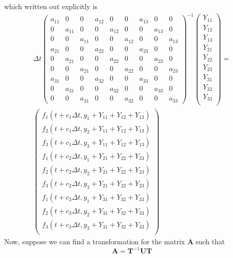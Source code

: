 \documentclass[10pt,a4paper]{article}
\newcommand{\bvec}[1]{\mathbf{#1}}
\begin{document}
which written out explicitly is
\begin{align*}
  \Delta t \begin{pmatrix}
    a_{11} & 0 & 0 &  a_{12} & 0 & 0 & a_{13} & 0 & 0 \\
    0 & a_{11} & 0 & 0 &  a_{12} & 0 & 0 & a_{13} & 0 \\
    0 & 0 & a_{11} & 0 & 0 &  a_{12} & 0 & 0 & a_{13} \\
    a_{21} & 0 & 0 &  a_{22} & 0 & 0 & a_{23} & 0 & 0 \\
    0 & a_{21} & 0 & 0 &  a_{22} & 0 & 0 & a_{23} & 0 \\
    0 & 0 & a_{21} & 0 & 0 &  a_{22} & 0 & 0 & a_{23} \\
    a_{31} & 0 & 0 &  a_{32} & 0 & 0 & a_{33} & 0 & 0 \\
    0 & a_{31} & 0 & 0 &  a_{32} & 0 & 0 & a_{33} & 0 \\
    0 & 0 & a_{31} & 0 & 0 &  a_{32} & 0 & 0 & a_{33}
     \end{pmatrix}^{-1}
     \begin{pmatrix}
       Y_{11} \\
       Y_{12} \\
       Y_{13} \\
       Y_{21} \\
       Y_{22} \\
       Y_{23} \\
       Y_{31} \\
       Y_{32} \\
       Y_{33} \\
     \end{pmatrix} = \\
  \begin{pmatrix}
      f_1(t+c_1\Delta t, y_1+Y_{11}+Y_{12}+Y_{13}) \\
      f_2(t+c_1\Delta t, y_2+Y_{11}+Y_{12}+Y_{13}) \\
      f_3(t+c_1\Delta t, y_3+Y_{11}+Y_{12}+Y_{13}) \\
      f_1(t+c_2\Delta t, y_1+Y_{21}+Y_{22}+Y_{23}) \\
      f_2(t+c_2\Delta t, y_2+Y_{21}+Y_{22}+Y_{23}) \\
      f_3(t+c_2\Delta t, y_3+Y_{21}+Y_{22}+Y_{23}) \\
      f_1(t+c_3\Delta t, y_1+Y_{31}+Y_{32}+Y_{33}) \\
      f_2(t+c_3\Delta t, y_2+Y_{31}+Y_{32}+Y_{33}) \\
      f_3(t+c_3\Delta t, y_3+Y_{31}+Y_{32}+Y_{33}) \\
  \end{pmatrix}
\end{align*}
Now, suppose we can find a transformation for the matrix $\bvec{A}$ such that
\begin{equation*}
  \bvec{A} = \bvec{T}^{-1}\bvec{U}\bvec{T}
\end{equation*}
\end{document}
